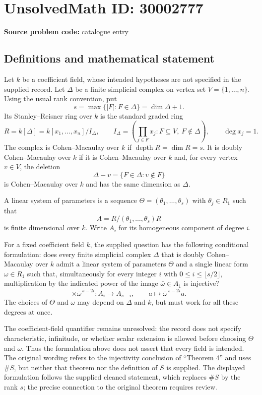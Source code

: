 \documentclass[11pt]{article}
\begin{document}
\section*{UnsolvedMath ID: 30002777}
\textbf{Source problem code:} catalogue entry
\subsection{Definitions and mathematical statement}
Let \(k\) be a coefficient field, whose intended hypotheses are not specified in the supplied record. Let \(\Delta\) be a finite simplicial complex on vertex set \(V=\{1,\ldots,n\}\). Using the usual rank convention, put
\[
s=\max\{|F|:F\in\Delta\}=\dim\Delta+1.
\]
Its Stanley--Reisner ring over \(k\) is the standard graded ring
\[
R=k[\Delta]=k[x_1,\ldots,x_n]/I_\Delta,
\qquad
I_\Delta=\left(\prod_{j\in F}x_j:F\subseteq V,\ F\notin\Delta\right),
\qquad \deg x_j=1.
\]
The complex is Cohen--Macaulay over \(k\) if \(\operatorname{depth}R=\dim R=s\). It is doubly Cohen--Macaulay over \(k\) if it is Cohen--Macaulay over \(k\) and, for every vertex \(v\in V\), the deletion
\[
\Delta-v=\{F\in\Delta:v\notin F\}
\]
is Cohen--Macaulay over \(k\) and has the same dimension as \(\Delta\).

A linear system of parameters is a sequence \(\Theta=(\theta_1,\ldots,\theta_s)\) with \(\theta_j\in R_1\) such that
\[
A=R/(\theta_1,\ldots,\theta_s)R
\]
is finite dimensional over \(k\). Write \(A_i\) for its homogeneous component of degree \(i\).

For a fixed coefficient field \(k\), the supplied question has the following conditional formulation: does every finite simplicial complex \(\Delta\) that is doubly Cohen--Macaulay over \(k\) admit a linear system of parameters \(\Theta\) and a single linear form \(\omega\in R_1\) such that, simultaneously for every integer \(i\) with \(0\leq i\leq\lfloor s/2\rfloor\), multiplication by the indicated power of the image \(\bar\omega\in A_1\) is injective?
\[
\times\bar\omega^{\,s-2i}:A_i\longrightarrow A_{s-i},
\qquad a\longmapsto\bar\omega^{\,s-2i}a.
\]
The choices of \(\Theta\) and \(\omega\) may depend on \(\Delta\) and \(k\), but must work for all these degrees at once.

The coefficient-field quantifier remains unresolved: the record does not specify characteristic, infinitude, or whether scalar extension is allowed before choosing \(\Theta\) and \(\omega\). Thus the formulation above does not assert that every field is intended. The original wording refers to the injectivity conclusion of ``Theorem 4'' and uses \(\#S\), but neither that theorem nor the definition of \(S\) is supplied. The displayed formulation follows the supplied cleaned statement, which replaces \(\#S\) by the rank \(s\); the precise connection to the original theorem requires review.
\end{document}
